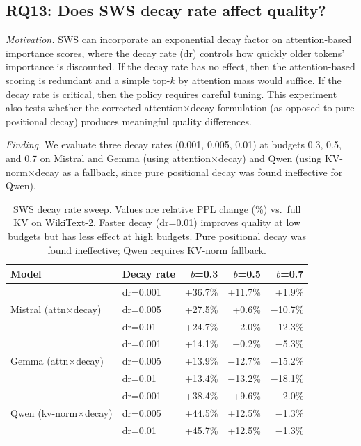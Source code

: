\documentclass[11pt]{article}
\newcommand{\sws}{SWS}
\newcommand{\pct}{\%}
\theoremstyle{definition}
\theoremstyle{plain}
\begin{document}
\subsection{RQ13: Does SWS decay rate affect quality?}
\label{sec:rq13}

\emph{Motivation.}  \sws{} can incorporate an exponential decay factor on attention-based importance scores, where the decay rate (dr) controls how quickly older tokens' importance is discounted.  If the decay rate has no effect, then the attention-based scoring is redundant and a simple top-$k$ by attention mass would suffice.  If the decay rate is critical, then the policy requires careful tuning.  This experiment also tests whether the corrected attention$\times$decay formulation (as opposed to pure positional decay) produces meaningful quality differences.

\emph{Finding.}  We evaluate three decay rates (0.001, 0.005, 0.01) at budgets 0.3, 0.5, and 0.7 on Mistral and Gemma (using attention$\times$decay) and Qwen (using KV-norm$\times$decay as a fallback, since pure positional decay was found ineffective for Qwen).

\begin{table}[t]
\centering
\caption{SWS decay rate sweep.  Values are relative PPL change (\%) vs.\ full KV on WikiText-2.  Faster decay (dr=0.01) improves quality at low budgets but has less effect at high budgets.  Pure positional decay was found ineffective; Qwen requires KV-norm fallback.}
\label{tab:decay-scan}
\small
\begin{tabular}{llrrr}
\toprule
Model & Decay rate & $b$=0.3 & $b$=0.5 & $b$=0.7 \\
\midrule
\multirow{3}{*}{Mistral (attn$\times$decay)} 
 & dr=0.001 & +36.7\pct{} & +11.7\pct{} & +1.9\pct{} \\
 & dr=0.005 & +27.5\pct{} & +0.6\pct{} & $-$10.7\pct{} \\
 & dr=0.01  & +24.7\pct{} & $-$2.0\pct{} & $-$12.3\pct{} \\
\midrule
\multirow{3}{*}{Gemma (attn$\times$decay)} 
 & dr=0.001 & +14.1\pct{} & $-$0.2\pct{} & $-$5.3\pct{} \\
 & dr=0.005 & +13.9\pct{} & $-$12.7\pct{} & $-$15.2\pct{} \\
 & dr=0.01  & +13.4\pct{} & $-$13.2\pct{} & $-$18.1\pct{} \\
\midrule
\multirow{3}{*}{Qwen (kv-norm$\times$decay)} 
 & dr=0.001 & +38.4\pct{} & +9.6\pct{} & $-$2.0\pct{} \\
 & dr=0.005 & +44.5\pct{} & +12.5\pct{} & $-$1.3\pct{} \\
 & dr=0.01  & +45.7\pct{} & +12.5\pct{} & $-$1.3\pct{} \\
\bottomrule
\end{tabular}
\end{table}
\end{document}

